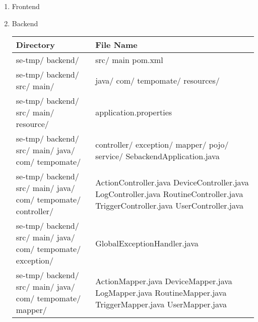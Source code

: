 \begin{enumerate}[label=\arabic*]
    \begin{enumerate}[label=\alph*]
        \item Frontend\\
        \item Backend
\begin{table}[H]
    \centering
    \begin{tabular}{m{3cm} m{4.5cm}}
        \toprule
        Directory & File Name \\
        \midrule
        se-tmp/ backend/ & src/ main \newline pom.xml  \\
        \midrule
        se-tmp/ backend/ src/ \newline main/ & java/ com/ tempomate/ \newline resources/ \\
        \midrule
        se-tmp/ backend/ src/ \newline main/ resource/ & application.properties \\
        \midrule
        se-tmp/ backend/ src/ \newline main/ java/ com/ \newline tempomate/ & controller/ \newline exception/ \newline mapper/ \newline pojo/ \newline service/ \newline SebackendApplication.java\\
        \midrule
        se-tmp/ backend/ src/ \newline main/ java/ com/ \newline tempomate/  controller/ & ActionController.java \newline DeviceController.java \newline LogController.java \newline RoutineController.java \newline TriggerController.java \newline UserController.java \\
        \midrule
        se-tmp/ backend/ src/ \newline main/ java/ com/ \newline tempomate/ exception/ & GlobalExceptionHandler.java \\
        \midrule
        se-tmp/ backend/ src/ \newline main/ java/ com/ \newline tempomate/ mapper/ & ActionMapper.java \newline DeviceMapper.java \newline LogMapper.java \newline RoutineMapper.java \newline TriggerMapper.java \newline UserMapper.java  \\

\end{tabular}
\end{table}
\end{enumerate}
\end{enumerate}
